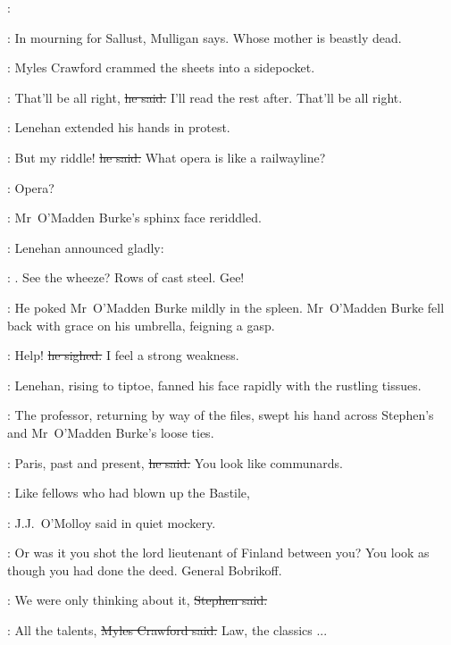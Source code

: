 \lenehan:


\StephenInt:
In mourning for Sallust,
Mulligan says.
Whose mother is beastly dead.

:
Myles Crawford crammed the sheets into a sidepocket.

\crawford:
That'll be all right,
\sout{he said.}
I'll read the rest after.
That'll be all right.

:
Lenehan extended his hands in protest.

\lenehan:
But my riddle!
\sout{he said.}
What opera is like a railwayline?

\omaddenburke:
Opera?

:
Mr~O'Madden Burke's sphinx face reriddled.

:
Lenehan announced gladly:

\lenehan:
.
See the wheeze?
Rows of cast steel.
Gee!

:
He poked Mr~O'Madden Burke mildly in the spleen.
Mr~O'Madden Burke fell back with grace on his umbrella,
feigning a gasp.

\omaddenburke:
Help!
\sout{he sighed.}
I feel a strong weakness.

:
Lenehan,
rising to tiptoe,
fanned his face rapidly with the rustling tissues.

:
The professor,
returning by way of the files,
swept his hand across Stephen's and Mr~O'Madden Burke's loose ties.

\machugh:
Paris, past and present,
\sout{he said.}
You look like communards.

\jjom:
Like fellows who had blown up the Bastile,

:
J.J.~O'Molloy said in quiet mockery.

\jjom:
Or was it you shot the lord lieutenant of Finland between you?
You look as though you had done the deed.
General Bobrikoff.



\Stephen:
We were only thinking about it,
\sout{Stephen said.}

\crawford:
All the talents,
\sout{Myles Crawford said.}
Law,
the classics ...

